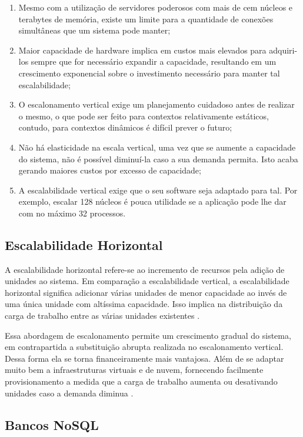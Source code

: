 \begin{enumerate}
    \item{Mesmo com a utilização de servidores poderosos com mais de cem núcleos
    e terabytes de memória, existe um limite para a quantidade de conexões
    simultâneas que um sistema pode manter;}
    \item{Maior capacidade de hardware implica em custos mais elevados para
    adquiri-los sempre que for necessário expandir a capacidade, resultando em
    um crescimento exponencial sobre o investimento necessário para manter tal
    escalabilidade;}
    \item{O escalonamento vertical exige um planejamento cuidadoso antes de
    realizar o mesmo, o que pode ser feito para contextos relativamente estáticos,
    contudo, para contextos dinâmicos é difícil prever o futuro;}
    \item{Não há elasticidade na escala vertical, uma vez que se aumente a
    capacidade do sistema, não é possível diminuí-la caso a sua demanda permita.
    Isto acaba gerando maiores custos por excesso de capacidade;}
    \item{A escalabilidade vertical exige que o seu software seja adaptado para
    tal. Por exemplo, escalar 128 núcleos é pouca utilidade se a aplicação pode
    lhe dar com no máximo 32 processos.}
\end{enumerate}

\subsection{Escalabilidade Horizontal}

A escalabilidade horizontal refere-se ao incremento de recursos pela adição
de unidades ao sistema. Em comparação a escalabilidade vertical, a escalabilidade
horizontal significa adicionar várias unidades de menor capacidade ao invés de
uma única unidade com altíssima capacidade. Isso implica na distribuição da carga
de trabalho entre as várias unidades existentes \cite{FreshGuide2012}.

Essa abordagem de escalonamento permite um crescimento gradual do sistema, em
contrapartida a substituição abrupta realizada no escalonamento vertical. Dessa
forma ela se torna financeiramente mais vantajosa. Além de se adaptar muito bem
a infraestruturas virtuais e de nuvem, fornecendo facilmente provisionamento
a medida que a carga de trabalho aumenta ou desativando unidades caso a demanda
diminua \cite{InterSystems2019}.

\subsection{Bancos NoSQL}

